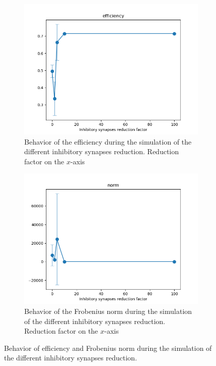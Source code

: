 \begin{figure}
  \begin{subfigure}[t]{0.48\textwidth}
    \centering
    \includegraphics[width=\textwidth]{efficiency_bin_evolution}
    \caption{Behavior of the efficiency during the simulation of the different inhibitory synapses reduction. Reduction factor on the $x$-axis}
    \label{fig:efficiency-evolution}
  \end{subfigure}
  \begin{subfigure}[t]{0.48\textwidth}
    \centering
    \includegraphics[width=\textwidth]{norm_evolution}
    \caption{Behavior of the Frobenius norm during the simulation of the different inhibitory synapses reduction. Reduction factor on the $x$-axis}
    \label{fig:norm-evolution}
  \end{subfigure}
  \caption{Behavior of efficiency and Frobenius norm during the simulation of the different inhibitory synapses reduction.}
  \label{fig:feature-distribution-behavior-4}
\end{figure}
